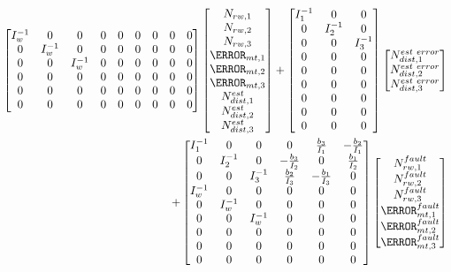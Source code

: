 \begin{align}
\begin{bmatrix}
I_w^{-1} & 0 & 0 & 0 & 0 & 0 & 0 & 0 & 0 \\
0 & I_w^{-1} & 0 & 0 & 0 & 0 & 0 & 0 & 0 \\ 
0 & 0 & I_w^{-1} & 0 & 0 & 0 & 0 & 0 & 0\\  
0 & 0 & 0 & 0 & 0 & 0 & 0 & 0 & 0\\
0 & 0 & 0 & 0 & 0 & 0 & 0 & 0 & 0\\
0 & 0 & 0 & 0 & 0 & 0 & 0 & 0 & 0\\
\end{bmatrix}
\begin{bmatrix}
N_{rw,1} \\
N_{rw,2} \\
N_{rw,3}\\
\m_{mt,1} \\
\m_{mt,2} \\
\m_{mt,3} \\
N^{est}_{dist,1} \\
N^{est}_{dist,2} \\
N^{est}_{dist,3}
\end{bmatrix}
+
\begin{bmatrix}
I_1^{-1} & 0 & 0 \\
0 & I_2^{-1} & 0 \\
0 & 0 & I_3^{-1}\\
0 & 0 & 0 \\
0 & 0 & 0 \\
0 & 0 & 0 \\
0 & 0 & 0 \\
0 & 0 & 0 \\
0 & 0 & 0 
\end{bmatrix}
\begin{bmatrix}
N^{est \ error}_{dist,1} \\
N^{est \ error}_{dist,2} \\
N^{est \ error}_{dist,3}\\
\end{bmatrix}
\\
+ 
\begin{bmatrix}
I_1^{-1} & 0 & 0 & 0 & \frac{b_3}{I_1} & -\frac{b_2}{I_1}\\
0 & I_2^{-1} & 0 & - \frac{b_3}{I_2} & 0 &  \frac{b_1}{I_2} \\ 
0 & 0 & I_3^{-1} &  \frac{b_2}{I_3} &  -\frac{b_1}{I_3} & 0 \\  
I_w^{-1} & 0 & 0 & 0 & 0 & 0 \\
0 & I_w^{-1} & 0 & 0 & 0 & 0 \\ 
0 & 0 & I_w^{-1} & 0 & 0 & 0 \\  
0 & 0 & 0 & 0 & 0 & 0 \\
0 & 0 & 0 & 0 & 0 & 0 \\
0 & 0 & 0 & 0 & 0 & 0 \\
\end{bmatrix}
\begin{bmatrix}
N^{fault}_{rw,1} \\
N^{fault}_{rw,2} \\
N^{fault}_{rw,3}\\
\m^{fault}_{mt,1} \\
\m^{fault}_{mt,2} \\
\m^{fault}_{mt,3} 
\end{bmatrix}
\label{eq:uioMatrices}
\end{align}
\normalsize